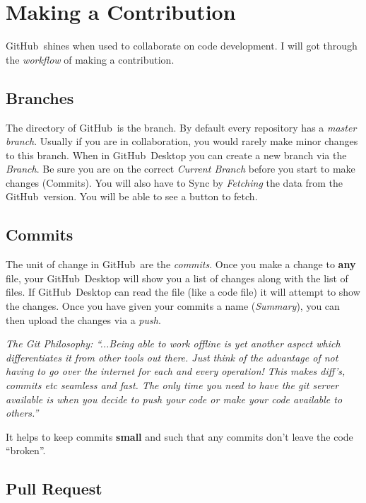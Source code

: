 \documentclass{article}
\newcommand{\gh}{GitHub~}
\begin{document}
\section{Making a Contribution}

\gh shines when used to collaborate on code development. I will got through the \textit{workflow} of making a contribution.

\subsection{Branches}

The directory of \gh is the branch. By default every repository has a \textit{master branch}. Usually if you are in collaboration, you would rarely make minor changes to this branch. When in \gh Desktop you can create a new branch via the \textit{Branch}. Be sure you are on the correct \textit{Current Branch} before you start to make changes (Commits). You will also have to Sync by \textit{Fetching} the data from the \gh version. You will be able to see a button to fetch.

\subsection{Commits}

The unit of change in \gh are the \textit{commits}. Once you make a change to \textbf{any} file, your \gh Desktop will show you a list of changes along with the list of files. If \gh Desktop can read the file (like a code file) it will attempt to show the changes. Once you have given your commits a name (\textit{Summary}), you can then upload the changes via a \textit{push}.

\textit{The Git Philosophy: ``...Being able to work offline is yet another aspect which differentiates it from other tools out there. Just think of the advantage of not having to go over the internet for each and every operation! This makes diff’s, commits etc seamless and fast. The only time you need to have the git server available is when you decide to push your code or make your code available to others.''}

It helps to keep commits \textbf{small} and such that any commits don't leave the code ``broken''.

\subsection{Pull Request}
\end{document}
